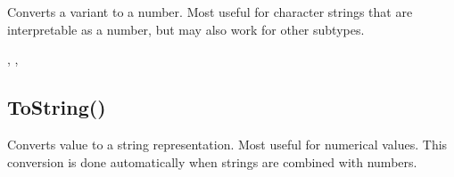 \documentclass[letterpaper,10pt,english]{sphinxmanual}
\begin{document}
\sphinxAtStartPar
Converts a variant to a number. Most useful for   character strings that are interpretable as a number, but may also   work for other subtypes.

\sphinxAtStartPar
{}

\begin{sphinxVerbatim}[commandchars=\\\{\}]
\end{sphinxVerbatim}

\sphinxAtStartPar
{}

\begin{sphinxVerbatim}[commandchars=\\\{\}]
\end{sphinxVerbatim}

\sphinxAtStartPar
{}

\sphinxAtStartPar
{}, , 


\subsection{ToString()}
\label{\detokenize{reference/peblmath:tostring}}
\sphinxAtStartPar
{}

\sphinxAtStartPar
{}

\sphinxAtStartPar
Converts value to a string representation. Most   useful for numerical values.  This conversion is done automatically   when strings are combined with numbers.

\sphinxAtStartPar
{}

\begin{sphinxVerbatim}[commandchars=\\\{\}]
\end{sphinxVerbatim}
\end{document}
